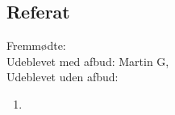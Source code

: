 \documentclass[12pt]{article}
\begin{document}
\subsection{Referat}
 Fremmødte:
 \\Udeblevet med afbud: Martin G,
 \\Udeblevet uden afbud: 
 
 \begin{enumerate}
    \item 
\end{enumerate}


\end{document}
